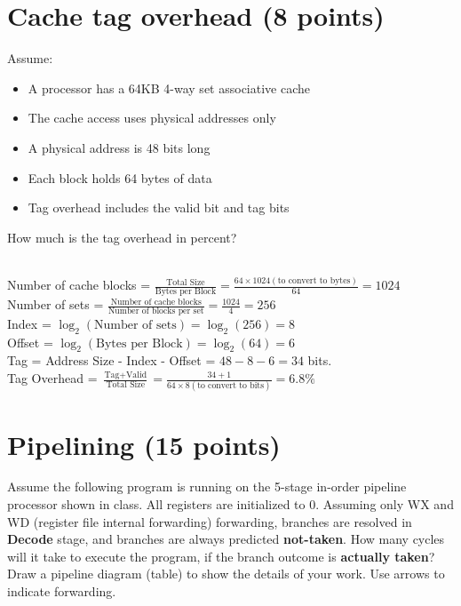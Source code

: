\documentclass{article}
\begin{document}
\section{Cache tag overhead (8 points)}
Assume:
\begin{itemize}
    \item A processor has a 64KB 4-way set associative cache
    \item The cache access uses physical addresses only
    \item A physical address is 48 bits long 
    \item Each block holds 64 bytes of data
    \item Tag overhead includes the valid bit and tag bits
\end{itemize}
How much is the tag overhead in percent?\\ \\
\noindent\fbox
{%
    \parbox{\linewidth}
    {%
        Number of cache blocks = $\frac{\text{Total Size}}{\text{Bytes per Block}} = \frac{64 \times 1024 (\text{to convert to bytes})}{64} = 1024$\\
        Number of sets = $\frac{\text{Number of cache blocks}}{\text{Number of blocks per set}} = \frac{1024}{4} = 256$ \\ 
        Index = $\log_{2} (\text{Number of sets}) = \log_{2} (256) = 8$\\
        Offset = $\log_{2} (\text{Bytes per Block}) = \log_{2} (64) = 6$\\
        Tag = Address Size - Index - Offset = $48 - 8 - 6 = 34$ bits. \\
        Tag Overhead = $\frac{\text{Tag} + \text{Valid}}{\text{Total Size}} = \frac{34 + 1}{64 \times 8(\text{to convert to bits})} = 6.8\%$
        
        
    }%
}

\section{Pipelining (15 points)}
Assume the following program is running on the 5-stage in-order pipeline processor shown in class. All registers are initialized to 0. Assuming only WX and WD (register file internal forwarding) forwarding, branches are resolved in \textbf{Decode} stage, and branches are always predicted \textbf{not-taken}. How many cycles will it take to execute the program, if the branch outcome is \textbf{actually taken}? Draw a pipeline diagram (table) to show the details of your work. Use arrows to indicate forwarding.
\end{document}
